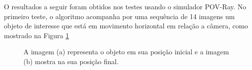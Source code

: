 O resultados a seguir foram obtidos nos testes usando o simulador POV-Ray.
No primeiro teste, o algoritmo acompanha por uma sequência de 14 imagens 
um objeto de interesse que está em movimento horizontal em relação a câmera, 
como mostrado na Figura \ref{fig:imgpapercerta}
\begin{figure}[H]
\centering
  \caption{A imagem (a) representa o objeto em sua posição inicial  
   e a imagem (b) mostra na sua posição final.}
  \label{fig:imgpapercerta}
\end{figure}


